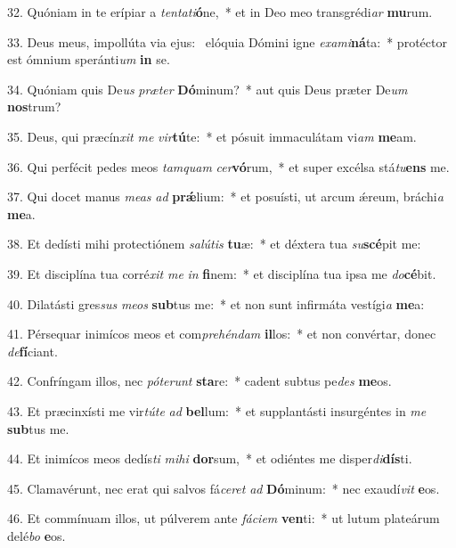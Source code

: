 32. Quóniam in te erípiar a \textit{ten}\textit{ta}\textit{ti}\textbf{ó}ne,~*  et in Deo meo transgrédi\textit{ar} \textbf{mu}rum.\

33. Deus meus, impollúta via ejus: \dag\  elóquia Dómini igne \textit{ex}\textit{a}\textit{mi}\textbf{ná}ta:~*  protéctor est ómnium speránti\textit{um} \textbf{in} se.\

34. Quóniam quis De\textit{us} \textit{præ}\textit{ter} \textbf{Dó}minum?~*  aut quis Deus præter De\textit{um} \textbf{nos}trum?\

35. Deus, qui præcín\textit{xit} \textit{me} \textit{vir}\textbf{tú}te:~*  et pósuit immaculátam vi\textit{am} \textbf{me}am.\

36. Qui perfécit pedes meos \textit{tam}\textit{quam} \textit{cer}\textbf{vó}rum,~*  et super excélsa stá\textit{tu}\textbf{ens} me.\

37. Qui docet manus \textit{me}\textit{as} \textit{ad} \textbf{prǽ}lium:~*  et posuísti, ut arcum ǽreum, bráchi\textit{a} \textbf{me}a.\

38. Et dedísti mihi protectiónem \textit{sa}\textit{lú}\textit{tis} \textbf{tu}æ:~*  et déxtera tua \textit{su}\textbf{scé}pit me:\

39. Et disciplína tua corré\textit{xit} \textit{me} \textit{in} \textbf{fi}nem:~*  et disciplína tua ipsa me \textit{do}\textbf{cé}bit.\

40. Dilatásti gres\textit{sus} \textit{me}\textit{os} \textbf{sub}tus me:~*  et non sunt infirmáta vestígi\textit{a} \textbf{me}a:\

41. Pérsequar inimícos meos et com\textit{pre}\textit{hén}\textit{dam} \textbf{il}los:~*  et non convértar, donec \textit{de}\textbf{fí}ciant.\

42. Confríngam illos, nec \textit{pót}\textit{e}\textit{runt} \textbf{sta}re:~*  cadent subtus pe\textit{des} \textbf{me}os.\

43. Et præcinxísti me vir\textit{tú}\textit{te} \textit{ad} \textbf{bel}lum:~*  et supplantásti insurgéntes in \textit{me} \textbf{sub}tus me.\

44. Et inimícos meos dedís\textit{ti} \textit{mi}\textit{hi} \textbf{dor}sum,~*  et odiéntes me disper\textit{di}\textbf{dís}ti.\

45. Clamavérunt, nec erat qui salvos fá\textit{ce}\textit{ret} \textit{ad} \textbf{Dó}minum:~*  nec exaudí\textit{vit} \textbf{e}os.\

46. Et commínuam illos, ut púlverem ante \textit{fá}\textit{ci}\textit{em} \textbf{ven}ti:~*  ut lutum plateárum delé\textit{bo} \textbf{e}os.\

